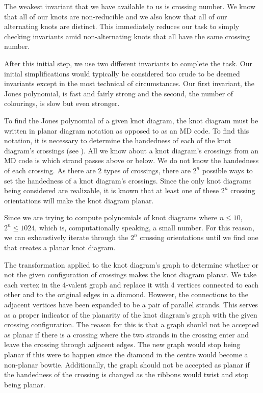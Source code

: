 \begin{paper}
The weakest invariant that we have available to us is crossing number.
We know that all of our knots are non-reducible and we also know that all of our
alternating knots are distinct.
This immediately reduces our task to simply checking invariants amid
non-alternating knots that all have the same crossing number.

After this initial step, we use two different invariants to complete the task.
Our initial simplifications would typically be considered too crude to be deemed
invariants except in the most technical of circumstances.
Our first invariant, the Jones polynomial, is fast and fairly strong and the
second, the number of colourings, is slow but even stronger.



To find the Jones polynomial of a given knot diagram, the knot diagram must be
written in planar diagram notation as opposed to as an MD code.
To find this notation, it is necessary to determine the handedness of each of
the knot diagram's crossings (see \figCrossings).
All we know about a knot diagram's crossings from an MD code is which strand
passes above or below.
We do not know the handedness of each crossing.
As there are 2 types of crossings, there are $2^n$ possible ways to set the
handedness of a knot diagram's crossings.
Since the only knot diagrams being considered are realizable, it is known that
at least one of these $2^n$ crossing orientations will make the knot diagram
planar.

Since we are trying to compute polynomials of knot diagrams where $n\leq10$,
$2^n\leq1024$, which is, computationally speaking, a small number.
For this reason, we can exhaustively iterate through the $2^n$ crossing
orientations until we find one that creates a planar knot diagram.

{The transformation applied to the knot diagram's graph to determine whether or
not the given configuration of crossings makes the knot diagram planar.
We take each vertex in the 4-valent graph and replace it with 4 vertices
connected to each other and to the original edges in a diamond.
However, the connections to the adjacent vertices have been expanded to be a
pair of parallel strands.
This serves as a proper indicator of the planarity of the knot diagram's graph
with the given crossing configuration.
The reason for this is that a graph should not be accepted as planar if there is
a crossing where the two strands in the crossing enter and leave the crossing
through adjacent edges.
The new graph would stop being planar if this were to happen since the diamond
in the centre would become a non-planar bowtie.
Additionally, the graph should not be accepted as planar if the handedness of
the crossing is changed as the ribbons would twist and stop being planar.}


\end{paper}
